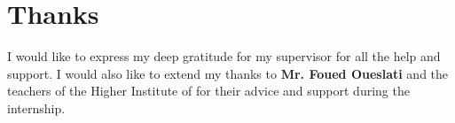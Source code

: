 \chapter*{Thanks}
I would like to express my deep gratitude for my supervisor for all the help and support. I would also like to extend my thanks to \textbf{Mr. Foued Oueslati} and the teachers of the Higher Institute of for their advice and support during the internship.
